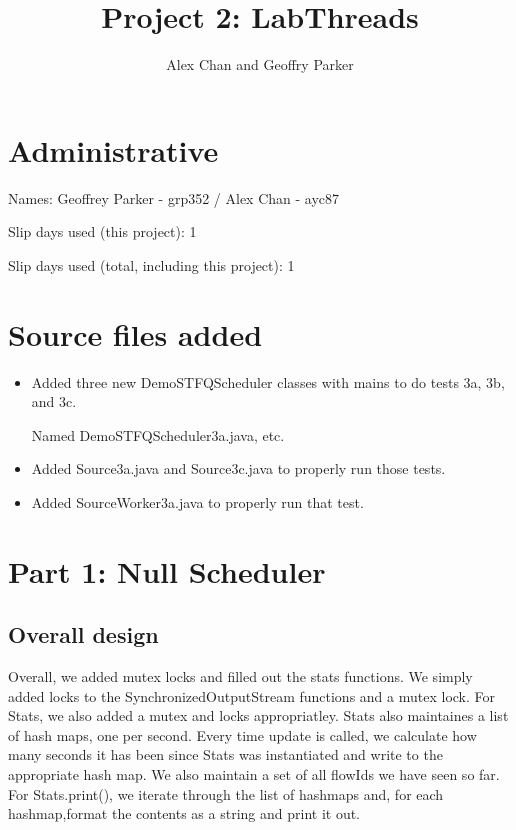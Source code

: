 \documentclass[11pt, letterpaper]{article}
\title{Project 2: LabThreads}
\author{Alex Chan and Geoffry Parker}
\begin{document}
\maketitle

\section{Administrative}

Names: Geoffrey Parker - grp352 / Alex Chan - ayc87

Slip days used (this project): 1

Slip days used (total, including this project): 1


\section{Source files added}

  \begin{itemize}

  \item Added three new DemoSTFQScheduler classes with mains to do tests 3a, 3b, and 3c.
  
  Named DemoSTFQScheduler3a.java, etc.

  \item Added Source3a.java and Source3c.java to properly run those tests.
  
  \item Added SourceWorker3a.java to properly run that test.

  \end{itemize}




\section{Part 1: Null Scheduler}

\subsection{Overall design}

Overall, we added mutex locks and filled out the stats functions.  We simply added locks to the SynchronizedOutputStream functions and a mutex lock.  For Stats, we also added a mutex and locks appropriatley.
Stats also maintaines a list of hash maps, one per second.  Every time update is called, we calculate how many seconds it has been since Stats was instantiated and write to the appropriate hash map.
We also maintain a set of all flowIds we have seen so far.  For Stats.print(), we iterate through the list of hashmaps and, for each hashmap,format the contents as a string and print it out.
\end{document}
